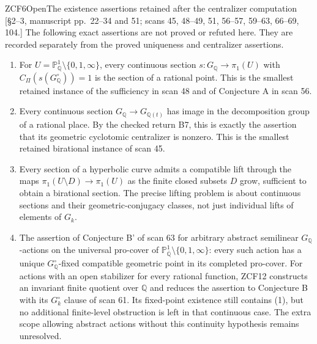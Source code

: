 \begin{result}{ZCF6}{Open}{The existence assertions retained after the centralizer computation}
\textup{[\S2--3, manuscript pp.\ 22--34 and 51; scans 45, 48--49,
51, 56--57, 59--63, 66--69, 104.]}
The following exact assertions are not proved or refuted here.
They are recorded separately from the proved uniqueness and
centralizer assertions.
\begin{enumerate}
\item For $U=\mathbb P^1_{\mathbb Q}\setminus\{0,1,\infty\}$,
every continuous section $s:G_{\mathbb Q}\to\pi_1(U)$ with
$C_\Pi(s(G_{\mathbb Q}^\circ))=1$ is the section of a rational
point. This is the smallest retained instance of the sufficiency
in scan 48 and of Conjecture A in scan 56.
\item Every continuous section $G_{\mathbb Q}\to G_{\mathbb Q(t)}$
has image in the decomposition group of a rational place.
By the checked return B7, this is exactly the assertion that its
geometric cyclotomic centralizer is nonzero. This is the smallest
retained birational instance of scan 45.
\item Every section of a hyperbolic curve admits a compatible
lift through the maps $\pi_1(U\setminus D)\to\pi_1(U)$ as the
finite closed subsets $D$ grow, sufficient to obtain a birational
section. The precise lifting problem is about continuous sections
and their geometric-conjugacy classes, not just individual lifts
of elements of $G_k$.
\item The assertion of Conjecture B' of scan 63 for arbitrary
abstract semilinear $G_{\mathbb Q}$-actions on the universal
pro-cover of $\mathbb P^1_{\overline{\mathbb Q}}
\setminus\{0,1,\infty\}$: every such action has a unique
$G_{\mathbb Q}^\circ$-fixed compatible geometric point in its
completed pro-cover. For actions with an open stabilizer for
every rational function, ZCF12 constructs an invariant finite
quotient over $\mathbb Q$ and reduces the assertion to
Conjecture B with its $G_k^\circ$ clause of scan 61.
Its fixed-point existence still contains (1),
but no additional finite-level obstruction is left in that
continuous case. The extra scope allowing abstract actions
without this continuity hypothesis remains unresolved.
\end{enumerate}
\end{result}

